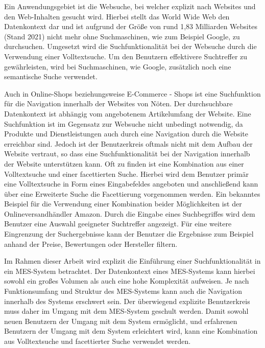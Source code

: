 Ein Anwendungsgebiet ist die Websuche, bei welcher explizit nach Websites und den Web-Inhalten gesucht wird. Hierbei stellt das World Wide Web den Datenkontext dar und ist aufgrund der Größe von rund 1,83 Milliarden Websites (Stand 2021) \cite{GuyFawkes.2021} nicht mehr ohne Suchmaschinen, wie zum Beispiel Google, zu durchsuchen. Umgesetzt wird die Suchfunktionalität bei der Websuche durch die Verwendung einer Volltextsuche. Um den Benutzern effektivere Suchtreffer zu gewährleisten, wird bei Suchmaschinen, wie Google, zusätzlich noch eine semantische Suche verwendet.

Auch in Online-Shops beziehungsweise E-Commerce - Shops ist eine Suchfunktion für die Navigation innerhalb der Websites von Nöten. Der durchsuchbare Datenkontext ist abhängig vom  angebotenem Artikelumfang der Website. Eine Suchfunktion ist im Gegensatz zur Websuche nicht unbedingt notwendig, da Produkte und Dienstleistungen auch durch eine Navigation durch die Website erreichbar sind. Jedoch ist der Benutzerkreis oftmals nicht mit dem Aufbau der Website vertraut, so dass eine Suchfunktionalität bei der Navigation innerhalb der Website unterstützen kann. Oft zu finden ist eine Kombination aus einer Volltextsuche und einer facettierten Suche. Hierbei wird dem Benutzer primär eine Volltextsuche in Form eines Eingabefeldes angeboten und anschließend kann über eine \glqq Erweiterte Suche\grqq{} die Facettierung vorgenommen werden. Ein bekanntes Beispiel für die Verwendung einer Kombination beider Möglichkeiten ist der Onlineversandhändler \glqq Amazon\grqq{}. Durch die Eingabe eines Suchbegriffes wird dem Benutzer eine Auswahl geeigneter Suchtreffer angezeigt. Für eine weitere Eingrenzung der Suchergebnisse kann der Benutzer die Ergebnisse zum Beispiel anhand der Preise, Bewertungen oder Hersteller filtern.

Im Rahmen dieser Arbeit wird explizit die Einführung einer Suchfunktionalität in ein MES-System betrachtet. Der Datenkontext eines MES-Systems kann hierbei sowohl ein großes Volumen als auch eine hohe Komplexität aufweisen. Je nach Funktionsumfang und Struktur des MES-Systems kann auch die Navigation innerhalb des Systems erschwert sein. Der überwiegend explizite Benutzerkreis muss daher im Umgang mit dem MES-System geschult werden. Damit sowohl neuen Benutzern der Umgang mit dem System ermöglicht, und erfahrenen Benutzern der Umgang mit dem System erleichtert wird, kann eine Kombination aus Volltextsuche und facettierter Suche verwendet werden.


